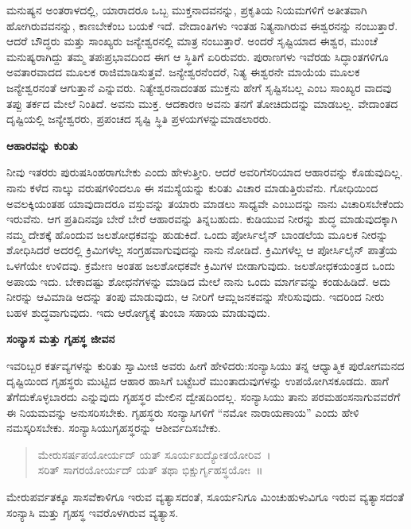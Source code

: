 ಮನುಷ್ಯನ ಅಂತರಾಳದಲ್ಲಿ, ಯಾರಾದರೂ ಒಬ್ಬ ಮುಕ್ತನಾದವನನ್ನು, ಪ್ರಕೃತಿಯ ನಿಯಮಗಳಿಗೆ ಅತೀತವಾಗಿ ಹೋಗಿರುವವನನ್ನು, ಕಾಣಬೇಕೆಂಬ ಬಯಕೆ ಇದೆ. ವೇದಾಂತಿಗಳು ಇಂತಹ ನಿತ್ಯನಾಗಿರುವ ಈಶ್ವರನನ್ನು ನಂಬುತ್ತಾರೆ. ಆದರೆ ಬೌದ್ಧರು ಮತ್ತು ಸಾಂಖ್ಯರು ಜನ್ಯೇಶ್ವರನಲ್ಲಿ ಮಾತ್ರ ನಂಬುತ್ತಾರೆ. ಅಂದರೆ ಸೃಷ್ಟಿಯಾದ ಈಶ್ವರ, ಮುಂಚೆ ಮನುಷ್ಯರಾಗಿದ್ದು ತಮ್ಮ ತಪಃಪ್ರಭಾವದಿಂದ ಈಗ ಆ ಸ್ಥಿತಿಗೆ ಏರಿರುವರು. ಪುರಾಣಗಳು ಇವೆರಡು ಸಿದ್ಧಾಂತಗಳಿಗೂ ಅವತಾರವಾದದ ಮೂಲಕ ರಾಜಿಮಾಡಿಸುತ್ತವೆ. ಜನ್ಯೇಶ್ವರನೆಂದರೆ, ನಿತ್ಯ ಈಶ್ವರನೇ ಮಾಯೆಯ ಮೂಲಕ ಜನ್ಯೇಶ್ವರನಂತೆ ಆಗುತ್ತಾನೆ ಎನ್ನುವರು. ನಿತ್ಯೇಶ್ವರನಾದಂತಹ ಮುಕ್ತನು ಹೇಗೆ ಸೃಷ್ಟಿಸಬಲ್ಲ ಎಂಬ ಸಾಂಖ್ಯರ ವಾದವು ತಪ್ಪು ತರ್ಕದ ಮೇಲೆ ನಿಂತಿದೆ. ಅವನು ಮುಕ್ತ. ಆದಕಾರಣ ಅವನು ತನಗೆ ತೋಚಿದುದನ್ನು ಮಾಡಬಲ್ಲ. ವೇದಾಂತದ ದೃಷ್ಟಿಯಲ್ಲಿ ಜನ್ಯೇಶ್ವರರು, ಪ್ರಪಂಚದ ಸೃಷ್ಟಿ ಸ್ಥಿತಿ ಪ್ರಳಯಗಳನ್ನು\break ಮಾಡಲಾರರು.

\centerline{\textbf{ಆಹಾರವನ್ನು ಕುರಿತು}}

ನೀವು ಇತರರು ಪುರುಷಸಿಂಹರಾಗಬೇಕು ಎಂದು ಹೇಳುತ್ತೀರಿ. ಆದರೆ ಅವರಿಗೆ\break ಸರಿಯಾದ ಆಹಾರವನ್ನು ಕೊಡುವುದಿಲ್ಲ. ನಾನು ಕಳೆದ ನಾಲ್ಕು ವರುಷಗಳಿಂದಲೂ ಈ ಸಮಸ್ಯೆಯನ್ನು ಕುರಿತು ವಿಚಾರ ಮಾಡುತ್ತಿರುವೆನು. ಗೋಧಿಯಿಂದ ಅವಲಕ್ಕಿಯಂತಹ ಯಾವುದಾದರೂ ವಸ್ತುವನ್ನು ತಯಾರು ಮಾಡಲು ಸಾಧ್ಯವೇ ಎಂಬುದನ್ನು ನಾನು ವಿಚಾರಿಸಬೇಕೆಂದು ಇರುವೆನು. ಆಗ ಪ್ರತಿದಿನವೂ ಬೇರೆ ಬೇರೆ ಆಹಾರವನ್ನು ತಿನ್ನಬಹುದು. ಕುಡಿಯುವ ನೀರನ್ನು ಶುದ್ಧ ಮಾಡುವುದಕ್ಕಾಗಿ ನಮ್ಮ ದೇಶಕ್ಕೆ ಹೊಂದುವ ಜಲಶೋಧಕವನ್ನು ಹುಡುಕಿದೆ. ಒಂದು ಪೋರ್ಸಿಲೈನ್​ ಬಾಂಡಲೆಯ ಮೂಲಕ ನೀರನ್ನು ಶೋಧಿಸಿದರೆ ಅದರಲ್ಲಿ ಕ್ರಿಮಿಗಳೆಲ್ಲ ಸಂಗ್ರಹವಾಗುವುದನ್ನು ನಾನು ನೋಡಿದೆ. ಕ್ರಿಮಿಗಳೆಲ್ಲ ಆ ಪೋರ್ಸಿಲೈನ್​ ಪಾತ್ರೆಯ ಒಳಗೆಯೇ ಉಳಿದವು. ಕ್ರಮೇಣ ಅಂತಹ ಜಲಶೋಧಕವೇ ಕ್ರಿಮಿಗಳ ಬೀಡಾಗುವುದು. ಜಲಶೋಧಕಯಂತ್ರದ ಒಂದು ಅಪಾಯ ಇದು. ಬೇಕಾದಷ್ಟು ಶೋಧನೆಗಳನ್ನು ಮಾಡಿದ ಮೇಲೆ ನಾನು ಒಂದು ಮಾರ್ಗವನ್ನು ಕಂಡುಹಿಡಿದೆ. ಅದು ನೀರನ್ನು ಆವಿಮಾಡಿ ಅದನ್ನು ತಂಪು ಮಾಡುವುದು, ಆ ನೀರಿಗೆ ಆಮ್ಲಜನಕವನ್ನು ಸೇರಿಸುವುದು. ಇದರಿಂದ ನೀರು ಬಹಳ ಶುದ್ಧವಾಗುವುದು. ಇದು ಆರೋಗ್ಯಕ್ಕೆ ತುಂಬಾ ಸಹಾಯ ಮಾಡುವುದು.

\centerline{\textbf{ಸಂನ್ಯಾಸ ಮತ್ತು ಗೃಹಸ್ಥ ಜೀವನ}}

ಇವರಿಬ್ಬರ ಕರ್ತವ್ಯಗಳನ್ನು ಕುರಿತು ಸ್ವಾಮೀಜಿ ಅವರು ಹೀಗೆ ಹೇಳಿದರು:\break ಸಂನ್ಯಾಸಿಯು ತನ್ನ ಆಧ್ಯಾತ್ಮಿಕ ಪುರೋಗಮನದ ದೃಷ್ಟಿಯಿಂದ ಗೃಹಸ್ಥರು ಮುಟ್ಟಿದ ಆಹಾರ ಹಾಸಿಗೆ ಬಟ್ಟೆಬರೆ ಮುಂತಾದುವುಗಳನ್ನು ಉಪಯೋಗಿಸಕೂಡದು. ಹಾಗೆ ತೆಗೆದುಕೊಳ್ಳಬಾರದು ಎನ್ನುವುದು ಗೃಹಸ್ಥರ ಮೇಲಿನ ದ್ವೇಷದಿಂದಲ್ಲ. ಸಂನ್ಯಾಸಿಯು ತಾನು ಪರಮಹಂಸನಾಗುವವರೆಗೆ ಈ ನಿಯಮವನ್ನು ಅನುಸರಿಸಬೇಕು. ಗೃಹಸ್ಥರು ಸಂನ್ಯಾಸಿಗಳಿಗೆ “ನಮೋ ನಾರಾಯಣಾಯ” ಎಂದು ಹೇಳಿ ನಮಸ್ಕರಿಸಬೇಕು. ಸಂನ್ಯಾಸಿಯು\break ಗೃಹಸ್ಥರನ್ನು ಆಶೀರ್ವದಿಸಬೇಕು.

\begin{verse}
 ಮೇರುಸರ್ಷಪಯೋರ್ಯದ್​ ಯತ್​ ಸೂರ್ಯಖದ್ಯೋತಯೋರಿವ~।\\
 ಸರಿತ್​ ಸಾಗರಯೋರ್ಯದ್​ ಯತ್​ ತಥಾ ಭಿಕ್ಷುರ್ಗೃಹಸ್ಥಯೋಃ~॥
\end{verse}

ಮೇರುಪರ್ವತಕ್ಕೂ ಸಾಸವೆಕಾಳಿಗೂ ಇರುವ ವ್ಯತ್ಯಾಸದಂತೆ, ಸೂರ್ಯನಿಗೂ ಮಿಂಚುಹುಳುವಿಗೂ ಇರುವ ವ್ಯತ್ಯಾಸದಂತೆ ಸಂನ್ಯಾಸಿ ಮತ್ತು ಗೃಹಸ್ಥ ಇವರೊಳಗಿರುವ ವ್ಯತ್ಯಾಸ.

